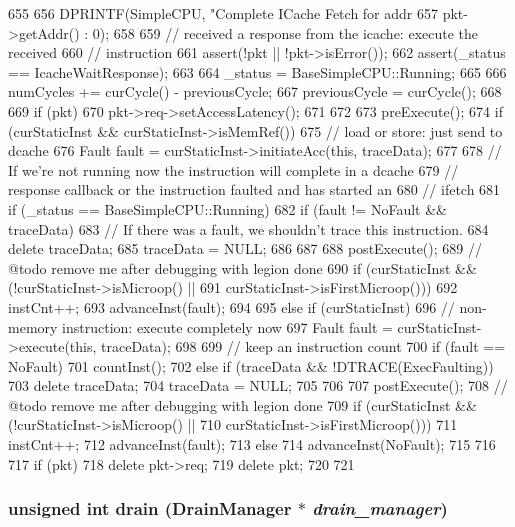 \begin{DoxyCode}
655 {
656     DPRINTF(SimpleCPU, "Complete ICache Fetch for addr %
657             pkt->getAddr() : 0);
658 
659     // received a response from the icache: execute the received
660     // instruction
661     assert(!pkt || !pkt->isError());
662     assert(_status == IcacheWaitResponse);
663 
664     _status = BaseSimpleCPU::Running;
665 
666     numCycles += curCycle() - previousCycle;
667     previousCycle = curCycle();
668 
669     if (pkt)
670         pkt->req->setAccessLatency();
671 
672 
673     preExecute();
674     if (curStaticInst && curStaticInst->isMemRef()) {
675         // load or store: just send to dcache
676         Fault fault = curStaticInst->initiateAcc(this, traceData);
677 
678         // If we're not running now the instruction will complete in a dcache
679         // response callback or the instruction faulted and has started an
680         // ifetch
681         if (_status == BaseSimpleCPU::Running) {
682             if (fault != NoFault && traceData) {
683                 // If there was a fault, we shouldn't trace this instruction.
684                 delete traceData;
685                 traceData = NULL;
686             }
687 
688             postExecute();
689             // @todo remove me after debugging with legion done
690             if (curStaticInst && (!curStaticInst->isMicroop() ||
691                         curStaticInst->isFirstMicroop()))
692                 instCnt++;
693             advanceInst(fault);
694         }
695     } else if (curStaticInst) {
696         // non-memory instruction: execute completely now
697         Fault fault = curStaticInst->execute(this, traceData);
698 
699         // keep an instruction count
700         if (fault == NoFault)
701             countInst();
702         else if (traceData && !DTRACE(ExecFaulting)) {
703             delete traceData;
704             traceData = NULL;
705         }
706 
707         postExecute();
708         // @todo remove me after debugging with legion done
709         if (curStaticInst && (!curStaticInst->isMicroop() ||
710                     curStaticInst->isFirstMicroop()))
711             instCnt++;
712         advanceInst(fault);
713     } else {
714         advanceInst(NoFault);
715     }
716 
717     if (pkt) {
718         delete pkt->req;
719         delete pkt;
720     }
721 }
\end{DoxyCode}
\hypertarget{classTimingSimpleCPU_a4e932bfc8aa6dfb998b8496a0f04ace3}{
\subsubsection[{drain}]{\setlength{\rightskip}{0pt plus 5cm}unsigned int drain ({\bf DrainManager} $\ast$ {\em drain\_\-manager})}}
\label{classTimingSimpleCPU_a4e932bfc8aa6dfb998b8496a0f04ace3}



